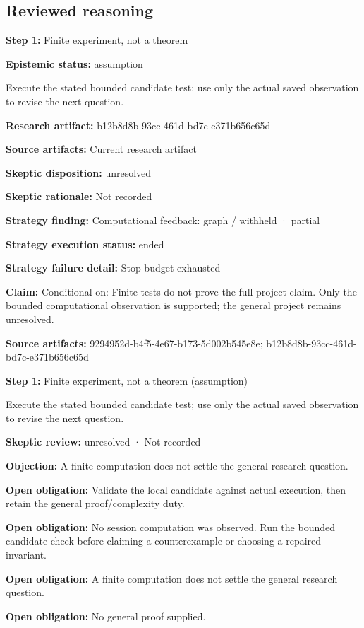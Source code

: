 \documentclass[11pt]{article}
\begin{document}
\subsection{Reviewed reasoning}
\textbf{Step 1:} Finite experiment, not a theorem\par
\textbf{Epistemic status:} assumption\par
Execute the stated bounded candidate test; use only the actual saved observation to revise the next question.\par
\textbf{Research artifact:} b12b8d8b-93cc-461d-bd7c-e371b656c65d\par
\textbf{Source artifacts:} Current research artifact\par
\textbf{Skeptic disposition:} unresolved\par
\textbf{Skeptic rationale:} Not recorded\par
\textbf{Strategy finding:} Computational feedback: graph / withheld · partial\par
\textbf{Strategy execution status:} ended\par
\textbf{Strategy failure detail:} Stop budget exhausted\par
\textbf{Claim:} Conditional on: Finite tests do not prove the full project claim. Only the bounded computational observation is supported; the general project remains unresolved.\par
\textbf{Source artifacts:} 9294952d-b4f5-4e67-b173-5d002b545e8e; b12b8d8b-93cc-461d-bd7c-e371b656c65d\par
\textbf{Step 1:} Finite experiment, not a theorem (assumption)\par
Execute the stated bounded candidate test; use only the actual saved observation to revise the next question.\par
\textbf{Skeptic review:} unresolved · Not recorded\par
\textbf{Objection:} A finite computation does not settle the general research question.\par
\textbf{Open obligation:} Validate the local candidate against actual execution, then retain the general proof/complexity duty.\par
\textbf{Open obligation:} No session computation was observed. Run the bounded candidate check before claiming a counterexample or choosing a repaired invariant.\par
\textbf{Open obligation:} A finite computation does not settle the general research question.\par
\textbf{Open obligation:} No general proof supplied.\par
\end{document}
